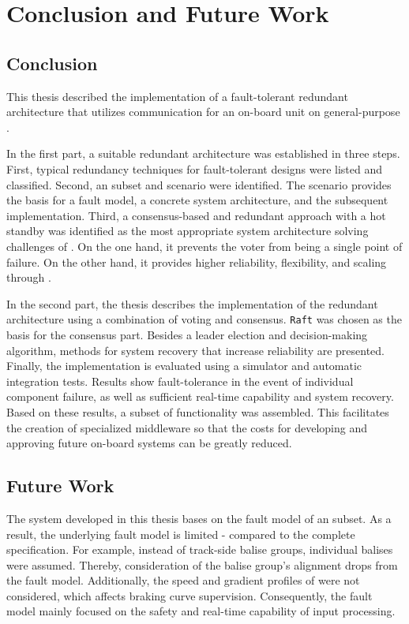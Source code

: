 \chapter{Conclusion and Future Work}

\section{Conclusion}
This thesis described the implementation of a fault-tolerant redundant architecture that utilizes  communication for an  on-board unit on general-purpose .

In the first part, a suitable redundant architecture was established in three steps.
First, typical redundancy techniques for fault-tolerant designs were listed and classified.
Second, an  subset and scenario were identified.
The scenario provides the basis for a fault model, a concrete system architecture, and the subsequent implementation.
Third, a consensus-based and redundant approach with a hot standby was identified as the most appropriate system architecture solving challenges of .
On the one hand, it prevents the voter from being a single point of failure.
On the other hand, it provides higher reliability, flexibility, and scaling through .

In the second part, the thesis describes the implementation of the redundant architecture using a combination of voting and consensus.
\texttt{Raft} was chosen as the basis for the consensus part.
Besides a leader election and decision-making algorithm, methods for system recovery that increase reliability are presented.
Finally, the implementation is evaluated using a simulator and automatic integration tests.
Results show fault-tolerance in the event of individual component failure, as well as sufficient real-time capability and system recovery.
Based on these results, a subset of  functionality was assembled.
This facilitates the creation of specialized  middleware so that the costs for developing and approving future  on-board systems can be greatly reduced.



\section{Future Work}

The system developed in this thesis bases on the fault model of an  subset.
As a result, the underlying fault model is limited - compared to the complete  specification.
For example, instead of track-side balise groups, individual balises were assumed.
Thereby, consideration of the balise group's alignment drops from the fault model.
Additionally, the speed and gradient profiles of  were not considered, which affects braking curve supervision.
Consequently, the fault model mainly focused on the safety and real-time capability of input processing.

